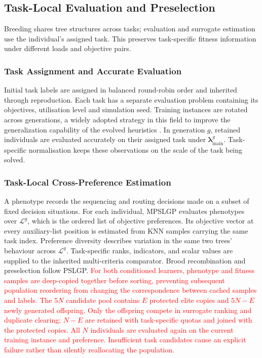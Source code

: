 \documentclass[10pt,journal]{IEEEtran}
\newcommand{\key}[1]{\textcolor{red}{#1}}
\begin{document}
\subsection{Task-Local Evaluation and Preselection}
Breeding shares tree structures across tasks; evaluation and surrogate estimation use the individual's assigned task. This preserves task-specific fitness information under different loads and objective pairs.

\subsubsection{Task Assignment and Accurate Evaluation}
Initial task labels are assigned in balanced round-robin order and inherited through reproduction. Each task has a separate evaluation problem containing its objectives, utilisation level and simulation seed. Training instances are rotated across generations, a widely adopted strategy in this field to improve the generalization capability of the evolved heuristics \cite{xu2023genetic}. In generation $g$, retained individuals are evaluated accurately on their assigned task under $\boldsymbol{\lambda}_{\mathrm{main}}^g$. Task-specific normalisation keeps these observations on the scale of the task being solved.

\subsubsection{Task-Local Cross-Preference Estimation}
A phenotype records the sequencing and routing decisions made on a subset of fixed decision situations. For each individual, MPSLGP evaluates phenotypes over $\mathcal{L}^g$, which is the ordered list of objective preferences. Its objective vector at every auxiliary-list position is estimated from KNN samples carrying the same task index. Preference diversity describes variation in the same two trees' behaviour across $\mathcal{L}^g$. Task-specific ranks, indicators, and scalar values are supplied to the inherited multi-criteria comparator. Brood recombination and preselection follow PSLGP. \key{For both conditioned learners, phenotype and fitness samples are deep-copied together before sorting, preventing subsequent population reordering from changing the correspondence between cached samples and labels. The $5N$ candidate pool contains $E$ protected elite copies and $5N-E$ newly generated offspring. Only the offspring compete in surrogate ranking and duplicate clearing; $N-E$ are retained with task-specific quotas and joined with the protected copies. All $N$ individuals are evaluated again on the current training instance and preference. Insufficient task candidates cause an explicit failure rather than silently reallocating the population.}
\end{document}
